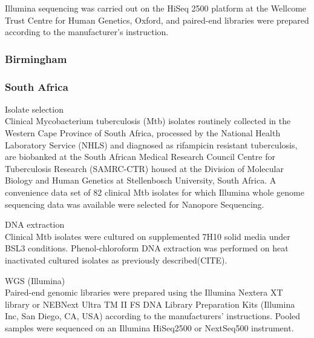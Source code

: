 Illumina sequencing was carried out on the HiSeq 2500 platform at the Wellcome Trust Centre for Human Genetics, Oxford, and paired-end libraries were prepared according to the manufacturer’s instruction. 

\subsubsection{Birmingham}


\subsubsection{South Africa}


Isolate selection \\
Clinical Mycobacterium tuberculosis (Mtb) isolates routinely collected in the Western Cape Province of South Africa, processed by the National Health Laboratory Service (NHLS) and diagnosed as rifampicin resistant tuberculosis, are biobanked at the South African Medical Research Council Centre for Tuberculosis Research (SAMRC-CTR) housed at the Division of Molecular Biology and Human Genetics at Stellenbosch University, South Africa. A convenience data set of 82 clinical Mtb isolates for which Illumina whole genome sequencing data was available were selected for Nanopore Sequencing.  

DNA extraction \\
Clinical Mtb isolates were cultured on supplemented 7H10 solid media under BSL3 conditions. Phenol-chloroform DNA extraction was performed on heat inactivated cultured isolates as previously described(CITE). 

WGS (Illumina) \\
Paired-end genomic libraries were prepared using the Illumina Nextera XT library or NEBNext Ultra TM II FS DNA Library Preparation Kits (Illumina Inc, San Diego, CA, USA) according to the manufacturers’ instructions. Pooled samples were sequenced on an Illumina HiSeq2500 or NextSeq500 instrument.

